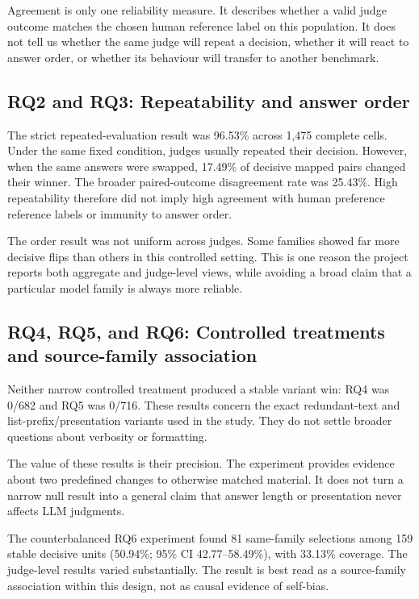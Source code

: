 \documentclass[11pt,a4paper]{article}
\begin{document}
Agreement is only one reliability measure. It describes whether a valid judge outcome matches the chosen human reference label on this population. It does not tell us whether the same judge will repeat a decision, whether it will react to answer order, or whether its behaviour will transfer to another benchmark.

\subsection*{RQ2 and RQ3: Repeatability and answer order}

The strict repeated-evaluation result was 96.53\% across 1,475 complete cells. Under the same fixed condition, judges usually repeated their decision. However, when the same answers were swapped, 17.49\% of decisive mapped pairs changed their winner. The broader paired-outcome disagreement rate was 25.43\%. High repeatability therefore did not imply high agreement with human preference reference labels or immunity to answer order.

The order result was not uniform across judges. Some families showed far more decisive flips than others in this controlled setting. This is one reason the project reports both aggregate and judge-level views, while avoiding a broad claim that a particular model family is always more reliable.

\subsection*{RQ4, RQ5, and RQ6: Controlled treatments and source-family association}

Neither narrow controlled treatment produced a stable variant win: RQ4 was 0/682 and RQ5 was 0/716. These results concern the exact redundant-text and list-prefix/presentation variants used in the study. They do not settle broader questions about verbosity or formatting.

The value of these results is their precision. The experiment provides evidence about two predefined changes to otherwise matched material. It does not turn a narrow null result into a general claim that answer length or presentation never affects LLM judgments.

The counterbalanced RQ6 experiment found 81 same-family selections among 159 stable decisive units (50.94\%; 95\% CI 42.77--58.49\%), with 33.13\% coverage. The judge-level results varied substantially. The result is best read as a source-family association within this design, not as causal evidence of self-bias.
\end{document}
